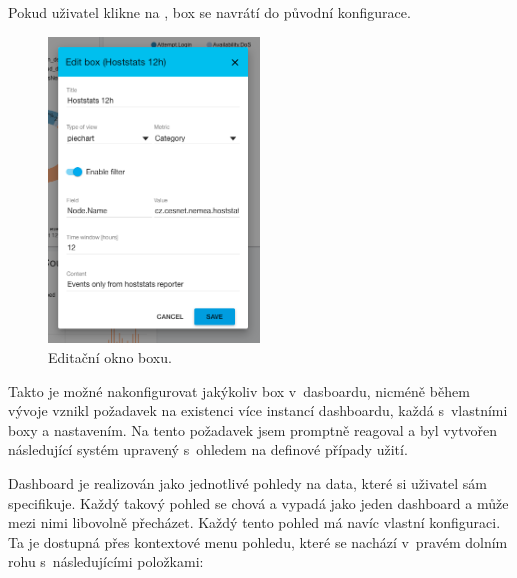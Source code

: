 Pokud uživatel klikne na , box se navrátí do původní konfigurace.

\begin{figure}[ht]
    \centering
    \includegraphics[width=0.5\textwidth]{fig/box_edit.png}
    \caption{Editační okno boxu.} \label{fig:box_edit}
\end{figure}

Takto je možné nakonfigurovat jakýkoliv box v~dasboardu, nicméně během vývoje vznikl požadavek na existenci více instancí dashboardu, každá s~vlastními boxy a nastavením. Na tento požadavek jsem promptně reagoval a byl vytvořen následující systém upravený s~ohledem na definové případy užití.

Dashboard je realizován jako jednotlivé pohledy na data, které si uživatel sám specifikuje. Každý takový pohled se chová a vypadá jako jeden dashboard a může mezi nimi libovolně přecházet. Každý tento pohled má navíc vlastní konfiguraci. Ta je dostupná přes kontextové menu pohledu, které se nachází v~pravém dolním rohu s~následujícími položkami:

